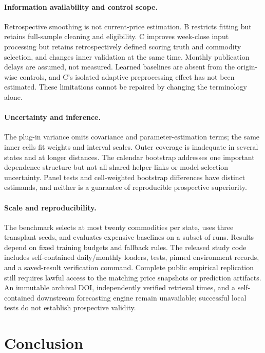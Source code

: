 \documentclass[sigconf,nonacm,balance=false]{acmart}
\begin{document}
\paragraph{Information availability and control scope.}
Retrospective smoothing is not current-price estimation. B restricts fitting but retains full-sample cleaning and eligibility. C improves week-close input processing but retains retrospectively defined scoring truth and commodity selection, and changes inner validation at the same time. Monthly publication delays are assumed, not measured. Learned baselines are absent from the origin-wise controls, and C's isolated adaptive preprocessing effect has not been estimated. These limitations cannot be repaired by changing the terminology alone.

\paragraph{Uncertainty and inference.}
The plug-in variance omits covariance and parameter-estimation terms; the same inner cells fit weights and interval scales. Outer coverage is inadequate in several states and at longer distances. The calendar bootstrap addresses one important dependence structure but not all shared-helper links or model-selection uncertainty. Panel tests and cell-weighted bootstrap differences have distinct estimands, and neither is a guarantee of reproducible prospective superiority.

\paragraph{Scale and reproducibility.}
The benchmark selects at most twenty commodities per state, uses three transplant seeds, and evaluates expensive baselines on a subset of runs. Results depend on fixed training budgets and fallback rules. The released study code includes self-contained daily/monthly loaders, tests, pinned environment records, and a saved-result verification command. Complete public empirical replication still requires lawful access to the matching price snapshots or prediction artifacts. An immutable archival DOI, independently verified retrieval times, and a self-contained downstream forecasting engine remain unavailable; successful local tests do not establish prospective validity.

\section{Conclusion}
\end{document}
